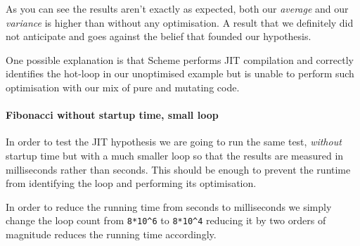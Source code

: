 \documentclass[
]{article}
\begin{document}
As you can see the results aren't exactly as expected, both our
\emph{average} and our \emph{variance} is higher than without any
optimisation. A result that we definitely did not anticipate and goes
against the belief that founded our hypothesis.

One possible explanation is that Scheme performs JIT compilation and
correctly identifies the hot-loop in our unoptimised example but is
unable to perform such optimisation with our mix of pure and mutating
code.

\hypertarget{fibonacci-without-startup-time-small-loop}{%
\paragraph{Fibonacci without startup time, small
loop}\label{fibonacci-without-startup-time-small-loop}}

In order to test the JIT hypothesis we are going to run the same test,
\emph{without} startup time but with a much smaller loop so that the
results are measured in milliseconds rather than seconds. This should be
enough to prevent the runtime from identifying the loop and performing
its optimisation.

In order to reduce the running time from seconds to milliseconds we
simply change the loop count from \texttt{8*10\^{}6} to
\texttt{8*10\^{}4} reducing it by two orders of magnitude reduces the
running time accordingly.
\end{document}
